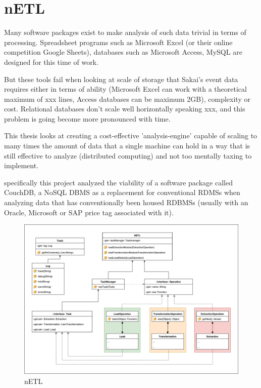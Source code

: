 



\section{nETL}
Many software packages exist to make analysis of such data trivial in terms of processing. Spreadsheet programs such as Microsoft Excel (or their online competition Google Sheets), databases such as Microsoft Access, MySQL are designed for this time of work.

But these tools fail when looking at scale of storage that Sakai's event data requires either in terms of ability (Microsoft Excel can work with a theoretical maximum of xxx lines, Access databases can be maximum 2GB), complexity or cost. Relational databases don't scale well horizontally speaking xxx, and this problem is going become more pronounced with time.

This thesis looks at creating a cost-effective 'analysis-engine' capable of scaling to many times the amount of data that a single machine can hold in a way that is still effective to analyze (distributed computing) and not too mentally taxing to implement.

specifically this project analyzed the viability of a software package called CouchDB, a NoSQL DBMS as a replacement for conventional RDMSs when analyzing data that has conventionally been housed RDBMSs (usually with an Oracle, Microsoft or SAP price tag associated with it).

\begin{figure}[h]
    \centering
    \includegraphics[scale=0.4]{../resources/figures/netlUML.pdf}
    \caption[nETL]{nETL}
    \label{nETL}
\end{figure}

